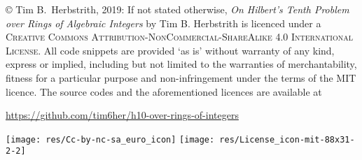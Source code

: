 \newpage%
\thispagestyle{empty}%
\vspace*{\fill}%

\begin{footnotesize}%
\noindent%
© Tim B.\ Herbstrith, 2019: 
If not stated otherwise, \emph{On Hilbert's Tenth Problem over Rings
of Algebraic Integers} by Tim B. Herbstrith is licenced under a \textsc{Creative
Commons Attribution-NonCommercial-ShareAlike 4.0 International License}. All
code snippets are provided `as is' without warranty of any kind, express or
implied, including but not limited to the warranties of merchantability, fitness
for a particular purpose and non-infringement under the terms of the
\textsc{MIT} licence. The source codes and the aforementioned licences are
available at
\begin{center}
 \url{https://github.com/tim6her/h10-over-rings-of-integers}
\end{center}
\hspace{\fill}
\texttt{[image: res/Cc-by-nc-sa\_euro\_icon]}
\texttt{[image: res/License\_icon-mit-88x31-2-2]}
\end{footnotesize}
\cleardoublepage


